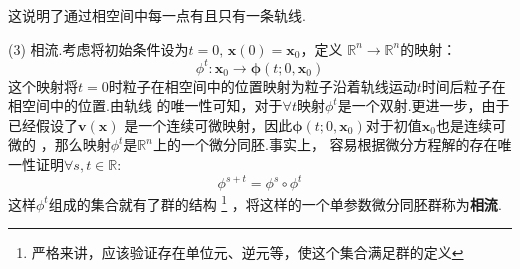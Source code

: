     这说明了通过相空间中每一点有且只有一条轨线.
    \par (3) 相流.考虑将初始条件设为$t=0,\, \bm{x}(0) = \bm{x}_0$，定义
    $\mathbb{R}^n \to \mathbb{R}^n$的映射：
    \begin{equation}
        \phi^{t}: \bm{x}_{0} \to \bm{\phi}(t; 0, \bm{x}_0)
    \end{equation}
    这个映射将$t=0$时粒子在相空间中的位置映射为粒子沿着轨线运动$t$时间后粒子在相空间中的位置.由轨线
    的唯一性可知，对于$\forall t$映射$\phi^t$是一个双射.更进一步，由于已经假设了$\bm{v}(\bm{x})$
    是一个连续可微映射，因此$\bm{\phi}(t; 0, \bm{x}_0)$对于初值$\bm{x}_0$也是连续可微的
    \cite{丁同仁2004常微分方程教程2}，那么映射$\phi^t$是$\mathbb{R}^n$上的一个微分同胚.事实上，
    容易根据微分方程解的存在唯一性证明$\forall s, t\in \mathbb{R}$:
    \begin{equation}
        \phi^{s + t} = \phi^s\circ\phi^{t}
        \label{def of phase flow}
    \end{equation}
    这样$\phi^t$组成的集合就有了群的结构
    \footnote{严格来讲，应该验证存在单位元、逆元等，使这个集合满足群的定义}
    ，将这样的一个单参数微分同胚群称为\textbf{相流}.

